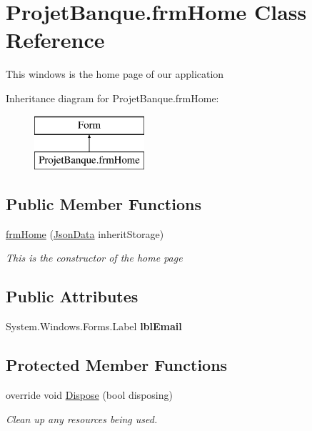\hypertarget{class_projet_banque_1_1frm_home}{}\section{Projet\+Banque.\+frm\+Home Class Reference}
\label{class_projet_banque_1_1frm_home}


This windows is the home page of our application  


Inheritance diagram for Projet\+Banque.\+frm\+Home\+:\begin{figure}[H]
\begin{center}
\leavevmode
\includegraphics[height=2.000000cm]{class_projet_banque_1_1frm_home}
\end{center}
\end{figure}
\subsection*{Public Member Functions}
\begin{DoxyCompactItemize}
\item 
\mbox{\hyperlink{class_projet_banque_1_1frm_home_a416d8bd59405cc63e21ba3b3186b1f86}{frm\+Home}} (\mbox{\hyperlink{class_projet_banque_1_1_json_data}{Json\+Data}} inherit\+Storage)
\begin{DoxyCompactList}\small\item\em This is the constructor of the home page \end{DoxyCompactList}\end{DoxyCompactItemize}
\subsection*{Public Attributes}
\begin{DoxyCompactItemize}
\item 
\mbox{\label{class_projet_banque_1_1frm_home_a3b024c90333c7c58ac87640ca54c27f9}} 
System.\+Windows.\+Forms.\+Label {\bfseries lbl\+Email}
\end{DoxyCompactItemize}
\subsection*{Protected Member Functions}
\begin{DoxyCompactItemize}
\item 
override void \mbox{\hyperlink{class_projet_banque_1_1frm_home_a9cfd52644c0e4b068485ac700fa9a3cb}{Dispose}} (bool disposing)
\begin{DoxyCompactList}\small\item\em Clean up any resources being used. \end{DoxyCompactList}\end{DoxyCompactItemize}


